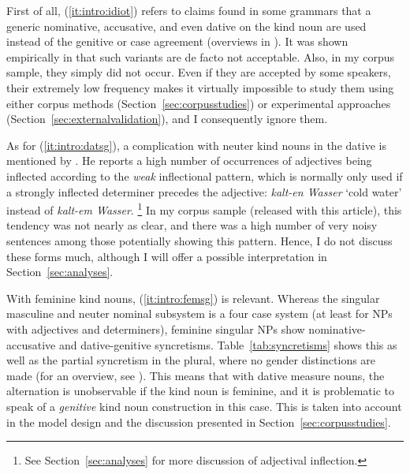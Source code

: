 \documentclass[USenglish]{article}
\begin{document}
\vspace{-1\baselineskip}

First of all, (\ref{it:intro:idiot}) refers to claims found in some grammars that a generic nominative, accusative, and even dative on the kind noun are used instead of the genitive or case agreement (overviews in \citealp{Hentschel1993,Zimmer2015}).
It was shown empirically in \cite{Hentschel1993} that such variants are de facto not acceptable.
Also, in my corpus sample, they simply did not occur.
Even if they are accepted by some speakers, their extremely low frequency makes it virtually impossible to study them using either corpus methods (Section~\ref{sec:corpusstudies}) or experimental approaches (Section~\ref{sec:externalvalidation}), and I consequently ignore them.

As for (\ref{it:intro:datsg}), a complication with neuter kind nouns in the dative is mentioned by \citet[20--22]{Zimmer2015}.
He reports a high number of occurrences of adjectives being inflected according to the \textit{weak} inflectional pattern, which is normally only used if a strongly inflected determiner precedes the adjective: \textit{kalt-en Wasser} `cold water' instead of \textit{kalt-em Wasser}.%
\footnote{See Section~\ref{sec:analyses} for more discussion of adjectival inflection.}
In my corpus sample (released with this article), this tendency was not nearly as clear, and there was a high number of very noisy sentences among those potentially showing this pattern.
Hence, I do not discuss these forms much, although I will offer a possible interpretation in Section~\ref{sec:analyses}.

\label{page:femininesyncretism}
With feminine kind nouns, (\ref{it:intro:femsg}) is relevant.
Whereas the singular masculine and neuter nominal subsystem is a four case system (at least for NPs with adjectives and determiners), feminine singular NPs show nominative-accusative and dative-genitive syncretisms.
Table~\ref{tab:syncretisms} shows this as well as the partial syncretism in the plural, where no gender distinctions are made (for an overview, see \citealp[XYZ]{Eisenberg2013a}).
This means that with dative measure nouns, the alternation is unobservable if the kind noun is feminine, and it is problematic to speak of a \textit{genitive} kind noun construction in this case.
This is taken into account in the model design and the discussion presented in Section~\ref{sec:corpusstudies}.
\end{document}

